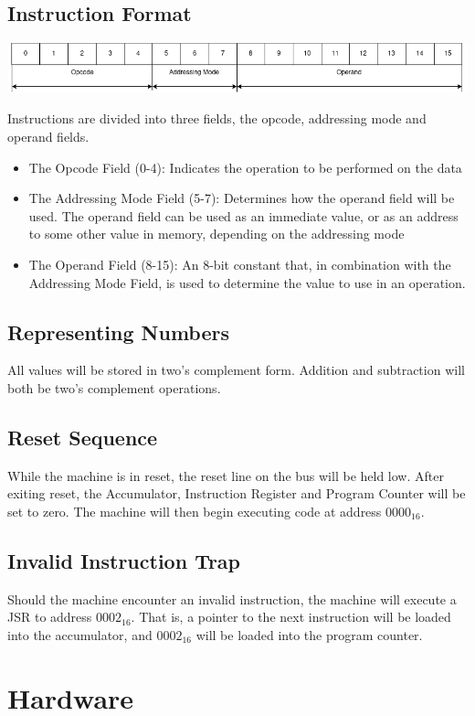 \documentclass{article}
\begin{document}
    \subsection{Instruction Format}\label{subsec:instruction-format}
    \begin{center}
        \includegraphics[scale=0.40]{img/Instruction_Format}
    \end{center}
    \par Instructions are divided into three fields, the opcode, addressing mode and operand fields.
    \begin{itemize}
        \item The Opcode Field (0-4): Indicates the operation to be performed on the data
        \item The Addressing Mode Field (5-7): Determines how the operand field will be used.
        The operand field can be used as an immediate value, or as an address to some other value in memory,
        depending on the addressing mode
        \item The Operand Field (8-15): An 8-bit constant that, in combination with the Addressing Mode Field, is
        used to determine the value to use in an operation.
    \end{itemize}

    \subsection{Representing Numbers}\label{subsec:representing-numbers}
    \par All values will be stored in two's complement form.
    Addition and subtraction will both be two's complement operations.


    \subsection{Reset Sequence}\label{subsec:reset-sequence}
    \par While the machine is in reset, the reset line on the bus will be held low.
    After exiting reset, the Accumulator, Instruction Register and Program Counter will
    be set to zero.
    The machine will then begin executing code at address $0000_{16}$.


    \subsection{Invalid Instruction Trap}\label{subsec:invalid-instruction-trap}
    \par Should the machine encounter an invalid instruction, the machine will execute a JSR to address $0002_{16}$.
    That is, a pointer to the next instruction will be loaded into the accumulator, and $0002_{16}$ will be loaded
    into the program counter.
    \pagebreak

    
    \pagebreak
    
    

    \section{Hardware}\label{sec:hardware}
\end{document}
